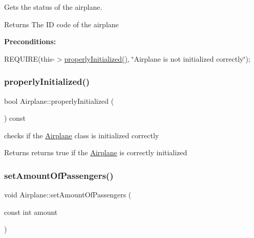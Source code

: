Gets the status of the airplane. 

\begin{DoxyReturn}{Returns}
The ID code of the airplane
\end{DoxyReturn}
{\bfseries Preconditions\+:}
\begin{DoxyItemize}
\item R\+E\+Q\+U\+I\+RE(this-\/$>$\mbox{\hyperlink{class_airplane_a6f80df8f692cc8d67d292c1e9f26d59e}{properly\+Initialized()}}, \char`\"{}\+Airplane is not initialized correctly\char`\"{}); 
\end{DoxyItemize}\mbox{\label{class_airplane_a6f80df8f692cc8d67d292c1e9f26d59e}} 
\subsubsection{\texorpdfstring{properly\+Initialized()}{properlyInitialized()}}
{\footnotesize\ttfamily bool Airplane\+::properly\+Initialized (\begin{DoxyParamCaption}{ }\end{DoxyParamCaption}) const}



checks if the \mbox{\hyperlink{class_airplane}{Airplane}} class is initialized correctly 

\begin{DoxyReturn}{Returns}
returns true if the \mbox{\hyperlink{class_airplane}{Airplane}} is correctly initialized 
\end{DoxyReturn}
\mbox{\label{class_airplane_aef14274f9efcb774d48b1557f6fc6b70}} 
\subsubsection{\texorpdfstring{set\+Amount\+Of\+Passengers()}{setAmountOfPassengers()}}
{\footnotesize\ttfamily void Airplane\+::set\+Amount\+Of\+Passengers (\begin{DoxyParamCaption}\item[{const int}]{amount }\end{DoxyParamCaption})}



